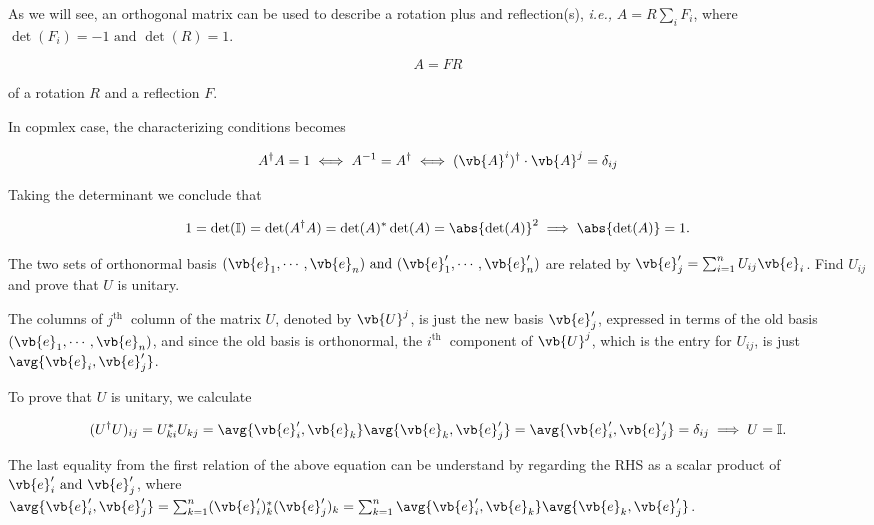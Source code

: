 \documentclass[a4paper,12pt]{report}
\begin{document}
As we will see, an orthogonal matrix can be used to describe a rotation plus and reflection(s), \textit{i.e.,} \(A = R\sum_{i}^{}F_{i}  \), where \(\det (F_{i} ) = -1 \text { and } \det (R) = 1\). 

\begin{equation}
    A = FR
\end{equation}

of a rotation \(R\) and a reflection \(F\). 

In copmlex case, the characterizing conditions becomes

\begin{equation}
    A^{\dagger} A = 1 \iff A^{-1} = A^{\dagger} \iff (\vb{A} ^{i} )^{\dagger} \cdot  \vb{A} ^{j} = \delta _{ij}
\end{equation}

Taking the determinant we conclude that 

\begin{equation}
    1 = \det (\mathbb{I}) = \det (A^{\dagger} A) = \det (A)^*\det (A) = \abs{\det (A)}^2 \implies \abs{\det (A)} = 1. 
\end{equation}

{The two sets of orthonormal basis \((\vb{e}_1, \cdots, \vb{e}_n ) \text { and } (\vb{e}'_1, \cdots, \vb{e}'_n )\) are related by \(\vb{e}' _{j} = \sum_{i=1}^{n} U_{ij}\vb{e} _{i}\). Find \(U_{ij} \) and prove that \(U\) is unitary.}
{The columns of \(j^{\text{th }} \) column of the matrix \(U\), denoted by \(\vb{U} ^{j} \), is just the new basis \(\vb{e}' _{j}  \), expressed in terms of the old basis \((\vb{e}_1, \cdots, \vb{e}_n )\), and since the old basis is orthonormal, the \(i^{\text{th }} \) component of \(\vb{U} ^{j} \), which is the entry for \(U_{ij} \), is just \(\avg{\vb{e} _{i}, \vb{e} '_{j}  } \). 

To prove that \(U\) is unitary, we calculate

\begin{equation}
    (U^{\dagger} U )_{ij} = U^*_{ki} U_{kj} = \avg{\vb{e} '_{i}, \vb{e} _{k} }\avg{\vb{e} _{k}, \vb{e} '_{j}  } = \avg{\vb{e} '_{i}, \vb{e} '_{j}  } = \delta _{ij} \implies U= \mathbb{I}.    
\end{equation}

The last equality from the first relation of the above equation can be understand by regarding the RHS as a scalar product of \(\vb{e} '_{i} \text { and } \vb{e} '_{j}  \), where \(\avg{\vb{e} '_{i}, \vb{e} '_{j}   } = \sum_{k=1}^{n} (\vb{e} '_{i} )^*_{k}(\vb{e} '_{j} )_{k} = \sum_{k=1}^{n} \avg{\vb{e} '_{i},\vb{e} _{k}  } \avg{\vb{e} _{k}, \vb{e} '_{j}  }    \).  


} 
\end{document}
